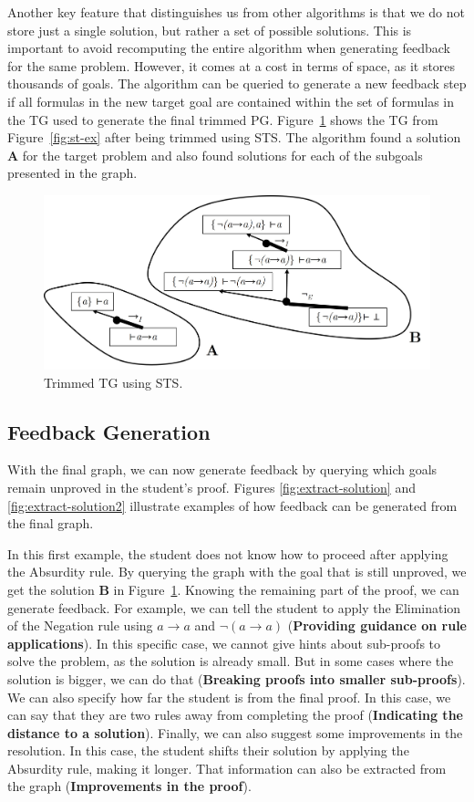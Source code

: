 Another key feature that distinguishes us from other algorithms is that we do not store just a single solution, but rather a set of possible solutions. This is important to avoid recomputing the entire algorithm when generating feedback for the same problem. However, it comes at a cost in terms of space, as it stores thousands of goals. The algorithm can be queried to generate a new feedback step if all formulas in the new target goal are contained within the set of formulas in the TG used to generate the final trimmed PG. Figure~\ref{fig:sg-trim} shows the TG from Figure~\ref{fig:st-ex} after being trimmed using STS. The algorithm found a solution \textbf{A} for the target problem and also found solutions for each of the subgoals presented in the graph.

\begin{figure}
    \centering
    \includegraphics[width=0.8\linewidth]{resources/sg-final.jpg}
    \caption{Trimmed TG using STS.}
    \label{fig:sg-trim}
\end{figure}

\subsection{Feedback Generation}
With the final graph, we can now generate feedback by querying which goals remain unproved in the student's proof. Figures \ref{fig:extract-solution} and \ref{fig:extract-solution2} illustrate examples of how feedback can be generated from the final graph.

In this first example, the student does not know how to proceed after applying the Absurdity rule. By querying the  graph with the goal that is still unproved, we get the solution \textbf{B} in Figure~\ref{fig:sg-trim}. Knowing the remaining part of the proof, we can generate feedback. For example, we can tell the student to apply the Elimination of the Negation rule using \(a \to a \) and  \(\lnot(a \to a) \) (\textbf{Providing guidance on rule applications}). In this specific case, we cannot give hints about sub-proofs to solve the problem, as the solution is already small. But in some cases where the solution is bigger, we can do that (\textbf{Breaking proofs into smaller sub-proofs}). We can also specify how far the student is from the final proof. In this case, we can say that they are two rules away from completing the proof (\textbf{Indicating the distance to a solution}). Finally, we can also suggest some improvements in the resolution. In this case, the student shifts their solution by applying the Absurdity rule, making it longer. That information can also be extracted from the graph (\textbf{Improvements in the proof}).

